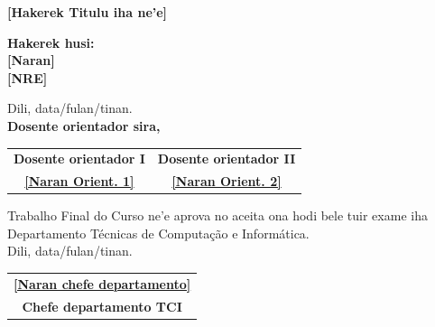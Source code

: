 \begin{titlepage}
\centering


{\large
\textbf{ [Hakerek Titulu iha ne'e] \\
}
}

\vspace{1cm}

{\large \textbf{Hakerek husi:}} \\
{\large \textbf{[Naran]}} \\
{\large \textbf{[NRE]}}

\vspace{1cm}

Dili,  data/fulan/tinan.\\
\vspace{0.5cm}
\textbf{Dosente orientador sira,} 
\vspace{0.5cm}

\begin{tabular}{cc}
     \textbf{Dosente orientador I}& \textbf{Dosente orientador II}  \\ [1cm]
     \underline{\textbf{[Naran Orient. 1]}}& \underline{\textbf{[Naran Orient. 2]}}
\end{tabular}

\vspace{2.5cm}

Trabalho Final do Curso ne'e aprova no aceita ona hodi bele tuir exame iha Departamento Técnicas de Computação e Informática. \\
\vspace{0.5cm}
Dili,  data/fulan/tinan.
\vspace{1.5cm}

\vspace{2cm}
\begin{tabular}{c}
     \underline{\textbf{[Naran chefe departamento]}}\\
    \textbf{Chefe departamento TCI}
     
\end{tabular}

\end{titlepage}


